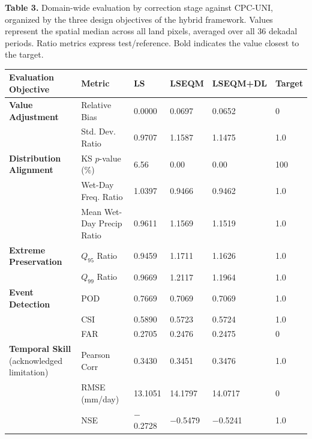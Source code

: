 \documentclass[11pt,a4paper]{article}
\begin{document}
\begin{landscape}
\label{tab:3}
\textbf{Table 3.} Domain-wide evaluation by correction stage against
CPC-UNI, organized by the three design objectives of the hybrid
framework. Values represent the spatial median across all land pixels,
averaged over all 36 dekadal periods. Ratio metrics express
test/reference. Bold indicates the value closest to the target.

\begingroup\small
\begin{longtable}[]{@{}llllll@{}}
\toprule
Evaluation Objective & Metric & LS & LSEQM & LSEQM+DL & Target \\
\midrule
\endhead
\bottomrule
\endlastfoot
\textbf{Value Adjustment} & Relative Bias & 0.0000 & 0.0697 & 0.0652 &
0 \\
& Std. Dev. Ratio & 0.9707 & 1.1587 & 1.1475 & 1.0 \\
\textbf{Distribution Alignment} & KS \(p\)-value (\%) & 6.56 & 0.00 &
0.00 & 100 \\
& Wet-Day Freq. Ratio & 1.0397 & 0.9466 & 0.9462 & 1.0 \\
& Mean Wet-Day Precip Ratio & 0.9611 & 1.1569 & 1.1519 & 1.0 \\
\textbf{Extreme Preservation} & \(Q_{95}\) Ratio & 0.9459 & 1.1711 &
1.1626 & 1.0 \\
& \(Q_{99}\) Ratio & 0.9669 & 1.2117 & 1.1964 & 1.0 \\
\textbf{Event Detection} & POD & 0.7669 & 0.7069 & 0.7069 & 1.0 \\
& CSI & 0.5890 & 0.5723 & 0.5724 & 1.0 \\
& FAR & 0.2705 & 0.2476 & 0.2475 & 0 \\
\textbf{Temporal Skill} (acknowledged limitation) & Pearson Corr &
0.3430 & 0.3451 & 0.3476 & 1.0 \\
& RMSE (mm/day) & 13.1051 & 14.1797 & 14.0717 & 0 \\
& NSE & $-$0.2728 & $-$0.5479 & $-$0.5241 & 1.0 \\
\end{longtable}
\endgroup
\end{landscape}
\end{document}
